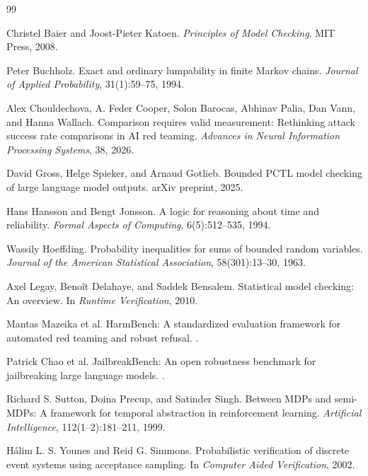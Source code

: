\documentclass[11pt]{article}
\begin{document}
\begin{thebibliography}{99}

Christel Baier and Joost-Pieter Katoen.
\newblock \emph{Principles of Model Checking}.
\newblock MIT Press, 2008.

Peter Buchholz.
\newblock Exact and ordinary lumpability in finite Markov chains.
\newblock \emph{Journal of Applied Probability}, 31(1):59--75, 1994.

Alex Chouldechova, A. Feder Cooper, Solon Barocas, Abhinav Palia, Dan Vann, and Hanna Wallach.
\newblock Comparison requires valid measurement: Rethinking attack success rate comparisons in AI red teaming.
\newblock \emph{Advances in Neural Information Processing Systems}, 38, 2026.

David Gross, Helge Spieker, and Arnaud Gotlieb.
\newblock Bounded PCTL model checking of large language model outputs.
\newblock arXiv preprint, 2025.

Hans Hansson and Bengt Jonsson.
\newblock A logic for reasoning about time and reliability.
\newblock \emph{Formal Aspects of Computing}, 6(5):512--535, 1994.

Wassily Hoeffding.
\newblock Probability inequalities for sums of bounded random variables.
\newblock \emph{Journal of the American Statistical Association}, 58(301):13--30, 1963.

Axel Legay, Beno\^{i}t Delahaye, and Saddek Bensalem.
\newblock Statistical model checking: An overview.
\newblock In \emph{Runtime Verification}, 2010.

Mantas Mazeika et al.
\newblock HarmBench: A standardized evaluation framework for automated red teaming and robust refusal.
.

Patrick Chao et al.
\newblock JailbreakBench: An open robustness benchmark for jailbreaking large language models.
.

Richard S. Sutton, Doina Precup, and Satinder Singh.
\newblock Between MDPs and semi-MDPs: A framework for temporal abstraction in reinforcement learning.
\newblock \emph{Artificial Intelligence}, 112(1--2):181--211, 1999.

H{\'a}lim L. S. Younes and Reid G. Simmons.
\newblock Probabilistic verification of discrete event systems using acceptance sampling.
\newblock In \emph{Computer Aided Verification}, 2002.

\end{thebibliography}
\end{document}
